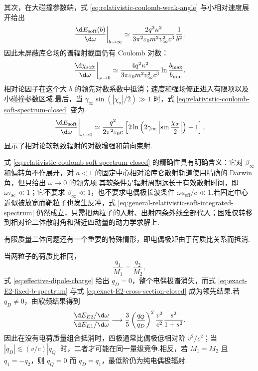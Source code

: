 其次，在大碰撞参数端，式 \eqref{eq:relativistic-coulomb-weak-angle} 与小相对速度展开给出
\begin{equation}
 \left.\frac{\d E_{\mathrm{soft}}(b)}{\d\omega}\right|_{b\to\infty}
 \simeq
 \frac{2q^2\kappa^2}{3\pi^2\varepsilon_0m^2v_\infty^2c^3}\frac{1}{b^2}.
 \label{eq:relativistic-coulomb-soft-large-b}
\end{equation}
因此未屏蔽库仑场的谱辐射截面仍有 Coulomb 对数：
\begin{equation}
 \left.\frac{\d\chi_{\mathrm{soft}}}{\d\omega}\right|_{\omega\to0}
 \simeq
 \frac{4q^2\kappa^2}{3\pi\varepsilon_0m^2v_\infty^2c^3}
 \ln\frac{b_{\max}}{b_{\min}}.
 \label{eq:relativistic-coulomb-soft-log-cross-section}
\end{equation}
相对论因子在这个大 $b$ 的领先对数系数中抵消；速度和强场修正进入有限项以及小碰撞参数区域.最后，当 $\gamma_\infty\sin(|\chi_\sigma|/2)\gg1$ 时，式 \eqref{eq:relativistic-coulomb-soft-spectrum-closed} 变为
\begin{equation}
 \left.\frac{\d E_{\mathrm{soft}}}{\d\omega}\right|_{\omega\to0}
 \simeq
 \frac{q^2}{2\pi^2\varepsilon_0c}
 \left[
 2\ln\left(2\gamma_\infty\left|\sin\frac{\chi_\sigma}{2}\right|\right)-1
 \right],
 \label{eq:relativistic-coulomb-soft-ultrarelativistic}
\end{equation}
显示了相对论软轫致辐射的对数增强和前向束射.

式 \eqref{eq:relativistic-coulomb-soft-spectrum-closed} 的精确性具有明确含义：它对 $\beta_\infty$ 和偏转角不作展开，对 $a<1$ 的固定中心相对论库仑散射轨道使用精确的 Darwin 角，但只给出 $\omega\to0$ 的领先项.其软条件是辐射周期远长于有效散射时间，即 $\omega\tau_{\mathrm{sc}}\ll1$；它不要求 $\beta_\infty\ll1$，也不要求电偶极长波条件 $\omega a_{\mathrm{eff}}/c\ll1$.若固定中心近似被放宽而靶粒子也发生反冲，式 \eqref{eq:general-relativistic-soft-integrated-spectrum} 仍然成立，只需把两粒子的入射、出射四条外线全部代入；困难仅转移到相对论二体散射角和渐近四动量的动力学求解上.


有限质量二体问题还有一个重要的特殊情形，即电偶极矩由于荷质比关系而抵消.

当两粒子的荷质比相同，
\begin{equation}
 \frac{q_1}{M_1}=\frac{q_2}{M_2},
\end{equation}
式 \eqref{eq:effective-dipole-charge} 给出 $q_D=0$，整个电偶极谱消失，而式 \eqref{eq:exact-E2-fixed-b-spectrum} 与式 \eqref{eq:exact-E2-cross-section-closed} 成为领先结果.若 $q_D\neq0$，由软频结果得到
\begin{equation}
 \frac{\d E_{E2}/\d\omega}{\d E_{E1}/\d\omega}
 \longrightarrow
 \frac{3}{5}\left(\frac{q_Q}{q_D}\right)^2
 \frac{v^2}{c^2}\frac{s^2}{1+s^2}.
 \label{eq:E2-E1-soft-ratio}
\end{equation}
因此在没有电荷质量组合抵消时，四极通常比偶极低相对阶 $v^2/c^2$；当 $|q_D|\lesssim(v/c)|q_Q|$ 时，二者才可能在同一量级竞争.相反，若 $M_1=M_2$ 且 $q_1=-q_2$，则 $q_Q=0$ 而 $q_D=q_1$，最低阶仍为纯电偶极辐射.

